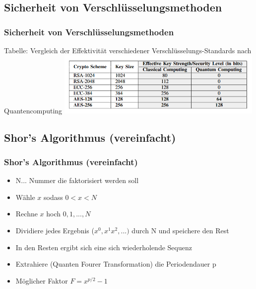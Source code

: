 \documentclass{beamer}
\renewcommand{\footnotesize}{\fontsize{8pt}{8pt}\selectfont}
\begin{document}
\subsection{Sicherheit von Verschlüsselungsmethoden}
\begin{frame}
\frametitle{Sicherheit von Verschlüsselungsmethoden}
\begin{center}
    Tabelle: Vergleich der Effektivität verschiedener
    Verschlüsselungs-Standards nach Quantencomputing
    \includegraphics[width=10cm]{Tabelle.png}
    \newline
    \footnotesize{"The impact of quantum computing on present cryptography", S.4}
    
\end{center}

\end{frame}

\subsection{Shor's Algorithmus (vereinfacht)}
\begin{frame}
\frametitle{Shor's Algorithmus (vereinfacht)}

\begin{itemize}
    \item N... Nummer die faktorisiert werden soll 
    \item Wähle $x$ sodass $0 < x < N$
    \item Rechne $x$ hoch $0, 1, ..., N$
    \item Dividiere jedes Ergebnis ($x^0, x^1 x^2, ...)$ durch N und speichere den Rest
    \newline
    \item In den Resten ergibt sich eine sich wiederholende Sequenz
    \item Extrahiere (Quanten Fourer Transformation) die Periodendauer p
    \newline
    \item Möglicher Faktor $F = x^{p/2} - 1$
\end{itemize}

\end{frame}
\end{document}
